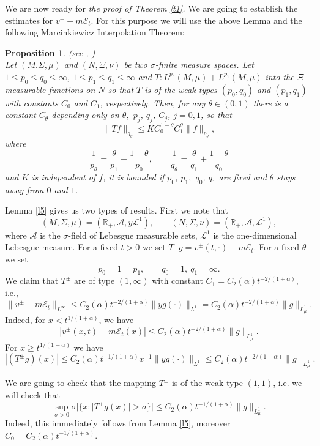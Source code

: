 \documentclass{article}
\newtheorem{proposition}{Proposition}
\def\sE{{\mathscr{E}}}
\def\sA{{\mathscr{A}}}
\newcommand{\bR}{\mathbb R}
\newcommand{\cL}{\mathcal L}
\begin{document}
We are now ready for {\it the proof of Theorem \ref{t1}.} 
We are going to establish the estimates for  $v^\pm - m \sE_t$.
For this purpose we will use the above Lemma and the following Marcinkiewicz Interpolation Theorem:
\begin{proposition}(see \cite[Theorem 6.0.2]{simon}, \cite[Theorem 1]{zygmund})\label{t-im}\\
Let $(M.\Sigma,\mu)$ and $(N,\Xi,\nu)$ be two $\sigma$-finite measure spaces. Let $1\le p_0\le q_0\le\infty$, $1\le p_1\le q_1\le \infty$ and 
$T:L^{p_0}(M, \mu)+L^{p_1}(M,\mu)$ into the $\Xi$-measurable functions on $N$ so that $T$ is of the weak  types $(p_0,q_0)$ and  $(p_1,q_1)$ with constants $C_0$ and $C_1$, respectively. Then, for any $\theta\in (0,1)$ there is a constant $C_\theta$ depending only on $\theta,$ $p_j$, $q_j$, $C_j$, $j=0,1$, so that
$$
\| Tf \|_{q_\theta} \le K C_0^{1-\theta}C_1^\theta \| f \|_{p_\theta},
$$
where 
$$
\frac 1{p_\theta} = \frac\theta{p_1} + \frac{1-\theta}{p_0},\qquad \frac 1{q_\theta} = \frac\theta{q_1} + \frac{1-\theta}{q_0}
$$
and $K$ is independent of $f$, it is bounded if $p_0$, $p_1,$ $q_0$, $q_1$ are fixed and $\theta$ stays away from $0$ and $1$.
\end{proposition}

Lemma \ref{l5}
gives us two types of results. First we note that
$$
(M,\Sigma, \mu ) = (\bR_+, \sA, y\cL^1), \qquad
(N,\Sigma, \nu ) = (\bR_+, \sA, \cL^1), 
$$
where $\sA$ is the $\sigma$-field of Lebesgue measurable sets, $\cL^1$ is the one-dimensional Lebesgue measure. For a fixed $t>0$ we set
$T^\pm g = v^\pm(t, \cdot) - m\sE_t$. For a fixed $\theta$ we set
$$
p_0 = 1 = p_1,\qquad q_0=1,\ q_1 = \infty.
$$
We claim that $T^\pm$ are of type $(1,\infty)$ with constant $C_1 = C_2(\alpha) t^{-2/(1+\alpha)}$, i.e.,
$$
\| v^\pm -m \sE_t\|_{L^\infty} \le C_2(\alpha) t^{-2/(1+\alpha)} \| y g(\cdot)\|_{L^1} = C_2(\alpha) t^{-2/(1+\alpha)} \| g\|_{L^1_\mu}.
$$
Indeed, for $x<t^{1/(1+\alpha)}$, we have
$$
| v^\pm(x,t) -m \sE_t(x)| \le C_2(\alpha) t^{-2/(1+\alpha)} \|  g \|_{L^1_\mu}.
$$
For $x\ge t^{1/(1+\alpha)}$ we have
$$
| (T^\pm g)(x)| \le C_2(\alpha) t^{-1/(1+\alpha)} x^{-1}\| y g(\cdot)\|_{L^1}\le C_2(\alpha) t^{-2/(1+\alpha)} \|  g\|_{L^1_\mu}.
$$

We are going to check that the mapping $T^\pm $ is of the weak type $(1,1)$, i.e. we will check that
$$
\sup_{\sigma>0} \sigma | \{ x: |T^\pm g(x)|>\sigma\}| \le C_2(\alpha) t^{-1/(1+\alpha)} \|g\|_{L^1_\mu}.
$$
Indeed, this immediately follows from Lemma \ref{l5}, moreover $C_0 = C_2(\alpha)  t^{-1/(1+\alpha)} $.
\end{document}
